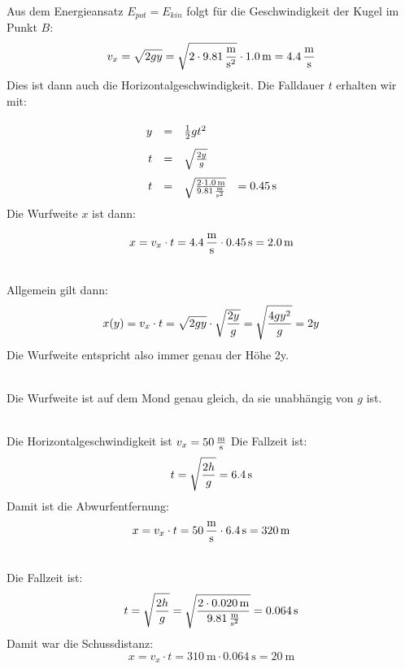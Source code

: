 \documentclass[a4paper]{article}
\begin{document}
\vspace{0.5 cm}

\\
Aus dem Energieansatz $E_{pot}=E_{kin}$ folgt für die Geschwindigkeit der Kugel
im Punkt $B$:
$$v_x=\sqrt{2gy}=\sqrt{2\cdot \SI{9,81}{\meter\over{\second^2}}}\cdot \SI{1,0}{\meter}=\SI{4,4}{\meter\over\second}$$
Dies ist dann auch die Horizontalgeschwindigkeit.
Die Falldauer $t$ erhalten wir mit:
$$
\renewcommand{\arraystretch}{2}
\begin{array}{rcll}

y&=&{1\over 2}gt^2  \\
t&=& \sqrt{2y\over g} \\
t&=& \sqrt{2\cdot \SI{1,0}{\meter} \over \SI{9,81}{\meter\over{\second^2}}} & = \SI{0,45}{\second}
\end{array}
$$
Die Wurfweite $x$ ist dann:

$$x=v_x \cdot t = \SI{4,4}{\meter\over\second}\cdot \SI{0,45}{\second} = \SI{2,0}{\meter}$$

\\
Allgemein gilt dann:
$$x(y)=v_x \cdot t =\sqrt{2gy}\cdot  \sqrt{2y\over g} = \sqrt{4gy^2\over g}= 2y$$
Die Wurfweite entspricht also immer genau der Höhe 2y. 
\vspace{0.5 cm}

\\
Die Wurfweite ist auf dem Mond genau gleich, da sie unabhängig von $g$ ist.
\vspace{0.5 cm}

\\
Die Horizontalgeschwindigkeit ist $v_x=\SI{50}{\meter\over \second}$
Die Fallzeit ist:
$$t= \sqrt{2h\over g}=\SI{6,4}{\second}$$
Damit ist die Abwurfentfernung:
$$x=v_x\cdot t = \SI{50}{\meter\over \second}\cdot \SI{6,4}{\second} = \SI{320}{\meter}$$
\vspace{0.5 cm}

\\
Die Fallzeit ist:
$$t= \sqrt{2h\over g}=\sqrt{2\cdot \SI{0,020}{\meter}\over \SI{9,81}{\meter\over {\second^2}}}=\SI{0,064}{\second}$$
Damit war die Schussdistanz:
$$x=v_x\cdot t = \SI{310}{\meter}\cdot\SI{0,064}{\second}=\SI{20}{\meter}$$
\vspace{0.5 cm}
\end{document}
